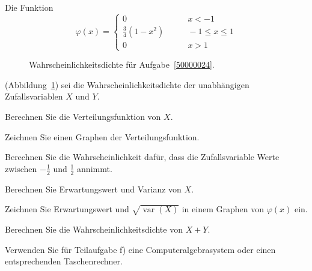 Die Funktion
\[
\varphi(x)=\begin{cases}
0&\qquad x< -1\\
\frac34(1-x^2)&\qquad -1\le x\le 1\\
0&\qquad x > 1
\end{cases}
\]
\begin{figure}[h]
\centering
\def\h{2.5}
\caption{Wahrscheinlichkeitsdichte für Aufgabe~\ref{50000024}.
\label{50000024:dichte}}
\end{figure}
(Abbildung~\ref{50000024:dichte})
sei die Wahrscheinlichkeitsdichte der unabhängigen Zufallsvariablen
$X$ und $Y$.
\begin{teilaufgaben}
\item Berechnen Sie die Verteilungsfunktion von $X$.
\item Zeichnen Sie einen Graphen der Verteilungsfunktion.
\item Berechnen Sie die Wahrscheinlichkeit dafür, dass die Zufallsvariable
Werte zwischen $-\frac12$ und $\frac12$ annimmt.
\item Berechnen Sie Erwartungswert und Varianz von $X$.
\item Zeichnen Sie Erwartungswert und $\sqrt{\operatorname{var}(X)}$ in
einem Graphen von $\varphi(x)$ ein.
\item Berechnen Sie die Wahrscheinlichkeitsdichte von $X+Y$.
\end{teilaufgaben}


\begin{hinweis}
Verwenden Sie für Teilaufgabe f) eine Computeralgebrasystem oder einen
entsprechenden Taschenrechner.
\end{hinweis}

